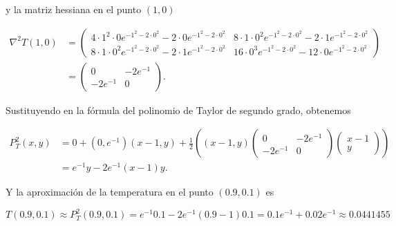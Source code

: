 \documentclass[
  spanish,
  a4paper,
]{scrreport}
\theoremstyle{definition}
\theoremstyle{remark}
\begin{document}
\begin{tcolorbox}
\begin{enumerate}
  y la matriz hessiana en el punto \((1,0)\)

  \begin{align*}
  \nabla^2T(1,0) &= 
  \begin{pmatrix}
  4\cdot 1^2\cdot 0e^{-1^2 - 2\cdot 0^2} - 2\cdot 0e^{-1^2 - 2\cdot 0^2} & 8\cdot 1\cdot 0^2e^{-1^2 - 2\cdot 0^2} - 2\cdot 1e^{-1^2 - 2\cdot 0^2} \\
  8\cdot 1\cdot 0^2e^{-1^2 - 2\cdot 0^2} - 2\cdot 1e^{-1^2 - 2\cdot 0^2} & 16\cdot 0^3e^{-1^2 - 2\cdot 0^2} - 12\cdot 0e^{-1^2 - 2\cdot 0^2}
  \end{pmatrix} \\
  &= \begin{pmatrix}
  0 & -2e^{-1} \\
  -2e^{-1} & 0
  \end{pmatrix}.
  \end{align*}

  Sustituyendo en la fórmula del polinomio de Taylor de segundo grado,
  obtenemos

  \begin{align*}
  P_T^2(x,y) &= 0 + (0,e^{-1})(x-1, y) + \frac{1}{2} \left((x-1,y)\begin{pmatrix}0 & -2e^{-1} \\ -2e^{-1} & 0\end{pmatrix}\begin{pmatrix}x-1 \\ y\end{pmatrix}\right) \\
  &= e^{-1}y - 2e^{-1}(x-1)y.
  \end{align*}

  Y la aproximación de la temperatura en el punto \((0.9,0.1)\) es

  \[
  T(0.9,0.1) 
  \approx P_T^2(0.9,0.1) 
  = e^{-1}0.1 - 2e^{-1}(0.9-1)0.1 
  = 0.1e^{-1} + 0.02e^{-1} 
  \approx 0.0441455
  \]
\end{enumerate}

\end{tcolorbox}
\end{document}
